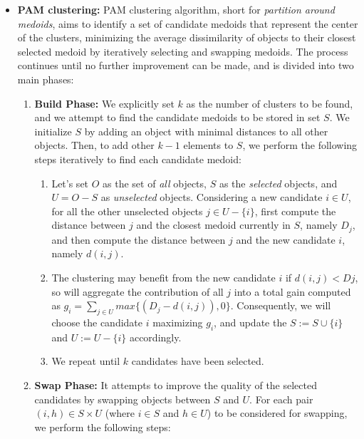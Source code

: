 \begin{itemize}[]
    \item \textbf{PAM clustering:} PAM \cite{PAM} clustering algorithm, short for \textit{partition around medoids}, aims to identify a set of candidate medoids that represent the center of the clusters, minimizing the average dissimilarity of objects to their closest selected medoid by iteratively selecting and swapping medoids. The process continues until no further improvement can be made, and is divided into two main phases:

    \begin{enumerate}[\IEEEsetlabelwidth{12)}]
        \item \textbf{Build Phase:} We explicitly set $k$ as the number of clusters to be found, and we attempt to find the candidate medoids to be stored in set $S$. We initialize $S$ by adding an object with minimal distances to all other objects. Then, to add other $k - 1$ elements to $S$, we perform the following steps iteratively to find each candidate medoid:

        \begin{enumerate}[\IEEEsetlabelwidth{12)}]
            \item Let's set $O$ as the set of \textit{all} objects, $S$ as the \textit{selected} objects, and $U = O - S$ as \textit{unselected} objects. Considering a new candidate $i \in U$, for all the other unselected objects $j \in U - \{ i \}$, first compute the distance between $j$ and the closest medoid currently in $S$, namely $D_j$, and then compute the distance between $j$ and the new candidate $i$, namely $d(i,j)$.
            
            \item The clustering may benefit from the new candidate $i$ if $d(i,j) < Dj$, so will aggregate the contribution of all $j$ into a total gain computed as $g_i = \sum_{j \in U} max \{(D_j - d(i,j)), 0 \}$. Consequently, we will choose the candidate $i$ maximizing $g_i$, and update the $S := S \cup \{i \}$ and $U := U - \{i \}$ accordingly.
            
            \item We repeat until $k$ candidates have been selected.
        \end{enumerate}

        \item \textbf{Swap Phase:} It attempts to improve the quality of the selected candidates by swapping objects between $S$ and $U$. For each pair $(i, h) \in S \times U$ (where $i \in S$ and $h \in U$) to be considered for swapping, we perform the following steps:


\end{enumerate}
\end{itemize}
